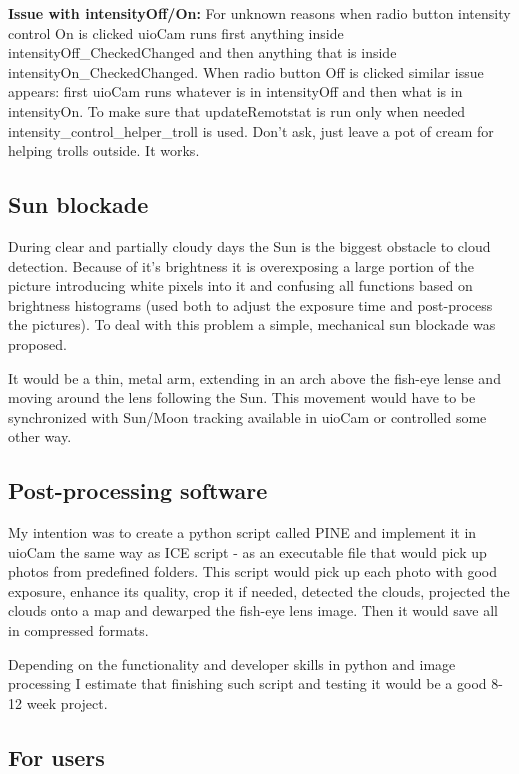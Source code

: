 \documentclass[]{book}
\begin{document}
		\textbf{Issue with intensityOff/On:} For unknown reasons when radio button intensity control On is clicked uioCam runs first anything inside intensityOff\_CheckedChanged and then anything that is inside intensityOn\_CheckedChanged. When radio button Off is clicked similar issue appears: first uioCam runs whatever is in intensityOff and then what is in intensityOn. To make sure that updateRemotstat is run only when needed intensity\_control\_helper\_troll is used. Don't ask, just leave a pot of cream for helping trolls outside. It works.
	
	\subsection{Sun blockade}
	
	During clear and partially cloudy days the Sun is the biggest obstacle to cloud detection. Because of it's brightness it is overexposing a large portion of the picture introducing white pixels into it and confusing all functions based on brightness histograms (used both to adjust the exposure time and post-process the pictures). To deal with this problem a simple, mechanical sun blockade was proposed.
	
	It would be a thin, metal arm, extending in an arch above the fish-eye lense and moving around the lens following the Sun. This movement would have to be synchronized with Sun/Moon tracking available in uioCam or controlled some other way.
	
	\subsection{Post-processing software}
	
	My intention was to create a python script called PINE and implement it in uioCam the same way as ICE script - as an executable file that would pick up photos from predefined folders. This script would pick up each photo with good exposure, enhance its quality, crop it if needed, detected the clouds, projected the clouds onto a map and dewarped the fish-eye lens image. Then it would save all in compressed formats.
	
	Depending on the functionality and developer skills in python and image processing I estimate that finishing such script and testing it would be a good 8-12 week project.
			
	\subsection{For users}
	
\end{document}
